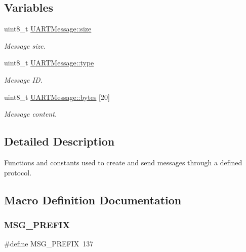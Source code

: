 \subsection*{Variables}
\begin{DoxyCompactItemize}
\item 
uint8\+\_\+t \mbox{\hyperlink{group__uart__protocol_ga6394755586b0b959fe069b16b85c749b}{U\+A\+R\+T\+Message\+::size}}
\begin{DoxyCompactList}\small\item\em Message size. \end{DoxyCompactList}\item 
uint8\+\_\+t \mbox{\hyperlink{group__uart__protocol_ga5249b6396f5721526146e662d7afefe4}{U\+A\+R\+T\+Message\+::type}}
\begin{DoxyCompactList}\small\item\em Message ID. \end{DoxyCompactList}\item 
uint8\+\_\+t \mbox{\hyperlink{group__uart__protocol_gafd3143672ede91e5dc2ec4d1b95f191b}{U\+A\+R\+T\+Message\+::bytes}} \mbox{[}20\mbox{]}
\begin{DoxyCompactList}\small\item\em Message content. \end{DoxyCompactList}\end{DoxyCompactItemize}


\subsection{Detailed Description}
Functions and constants used to create and send messages through a defined protocol. 

\subsection{Macro Definition Documentation}
\mbox{\label{group__uart__protocol_ga155260c75bcf6f1b9ff00fac4ad1cc48}} 
\subsubsection{\texorpdfstring{M\+S\+G\+\_\+\+P\+R\+E\+F\+IX}{MSG\_PREFIX}}
{\footnotesize\ttfamily \#define M\+S\+G\+\_\+\+P\+R\+E\+F\+IX~137}

